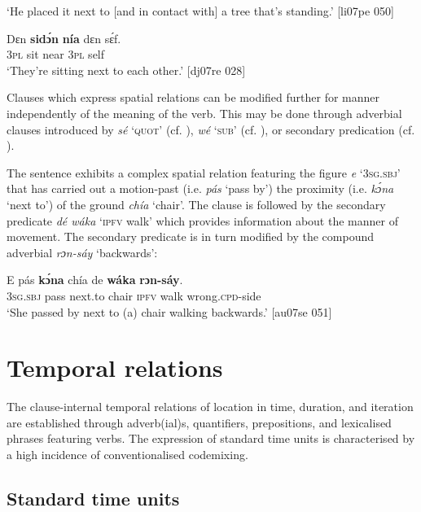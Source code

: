 \glt ‘He placed it next to [and in contact with] a tree that’s standing.’ [li07pe 050]
\z


\ea%
    \label{ex:key:993}
    \gll Dɛn  \textbf{sidɔ́n}  \textbf{nía}    dɛn  sɛ́f.\\
\textsc{3pl}  sit    near    \textsc{3pl}  self\\

\glt ‘They’re sitting next to each other.’ [dj07re 028]
\z

Clauses which express spatial relations can be modified further for manner independently of the meaning of the verb. This may be done through adverbial clauses introduced by \textit{sé} ‘\textsc{quot}’ (cf. ), \textit{wé} ‘\textsc{sub}’ (cf. ), or secondary predication (cf. ).


The sentence  exhibits a complex spatial relation featuring the figure \textit{e} ‘\textsc{3sg.sbj}’ that has carried out a motion-past (i.e. \textit{pás} ‘pass by’) the proximity (i.e. \textit{kɔ́na} ‘next to’) of the ground \textit{chía} ‘chair’. The clause is followed by the secondary predicate \textit{dé wáka} ‘\textsc{ipfv} walk’ which provides information about the manner of movement. The secondary predicate is in turn modified by the compound adverbial \textit{rɔn-sáy} ‘backwards’:



\ea%
    \label{ex:key:994}
    \gll E    pás \textbf{kɔ́na} chía de \textbf{wáka}  \textbf{rɔn-sáy}.\\
\textsc{3sg.sbj}  pass    next.to  chair  \textsc{ipfv}  walk  wrong.\textsc{cpd}{}-side\\

\glt ‘She passed by next to (a) chair walking backwards.’ [au07se 051]
\z

\section{Temporal relations}\label{sec:8.2}

The clause-internal temporal relations of location in time, duration, and iteration are established through adverb(ial)s, quantifiers, prepositions, and lexicalised phrases featuring verbs. The expression of standard time units is characterised by a high incidence of conventionalised codemixing.

\subsection{Standard time units}


